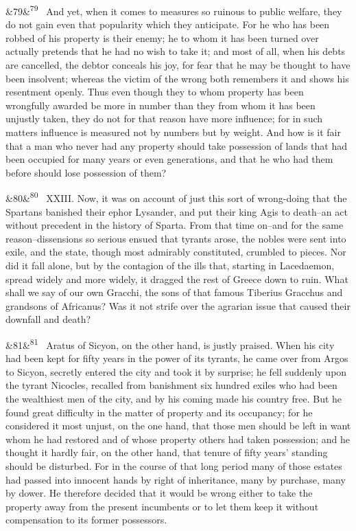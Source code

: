 \documentclass[12pt]{article}
\newcommand{\para}[1][]{\par\noindent\ifx&#1&\else\textsuperscript{\footnotesize #1}~\fi}
\begin{document}
\para[79] And yet, when it comes to measures so ruinous to public welfare, they do not gain even that popularity which they anticipate. For he who has been robbed of his property is their enemy; he to whom it has been turned over actually pretends that he had no wish to take it; and most of all, when his debts are cancelled, the debtor conceals his joy, for fear that he may be thought to have been insolvent; whereas the victim of the wrong both remembers it and shows his resentment openly. Thus even though they to whom property has been wrongfully awarded be more in number than they from whom it has been unjustly taken, they do not for that reason have more influence; for in such matters influence is measured not by numbers but by weight. And how is it fair that a man who never had any property should take possession of lands that had been occupied for many years or even generations, and that he who had them before should lose possession of them?

\para[80] XXIII. Now, it was on account of just this sort of wrong-doing that the Spartans banished their ephor Lysander, and put their king Agis to death--an act without precedent in the history of Sparta. From that time on--and for the same reason--dissensions so serious ensued that tyrants arose, the nobles were sent into exile, and the state, though most admirably constituted, crumbled to pieces. Nor did it fall alone, but by the contagion of the ills that, starting in Lacedaemon, spread widely and more widely, it dragged the rest of Greece down to ruin. What shall we say of our own Gracchi, the sons of that famous Tiberius Gracchus and grandsons of Africanus? Was it not strife over the agrarian issue that caused their downfall and death?

\para[81] Aratus of Sicyon, on the other hand, is justly praised. When his city had been kept for fifty years in the power of its tyrants, he came over from Argos to Sicyon, secretly entered the city and took it by surprise; he fell suddenly upon the tyrant Nicocles, recalled from banishment six hundred exiles who had been the wealthiest men of the city, and by his coming made his country free. But he found great difficulty in the matter of property and its occupancy; for he considered it most unjust, on the one hand, that those men should be left in want whom he had restored and of whose property others had taken possession; and he thought it hardly fair, on the other hand, that tenure of fifty years' standing should be disturbed. For in the course of that long period many of those estates had passed into innocent hands by right of inheritance, many by purchase, many by dower. He therefore decided that it would be wrong either to take the property away from the present incumbents or to let them keep it without compensation to its former possessors.
\end{document}
